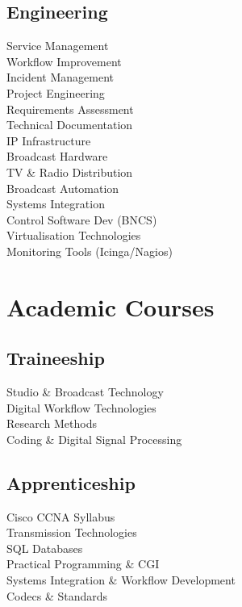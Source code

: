 \documentclass[]{deedy-resume-openfont}
\begin{document}
\begin{minipage}[t]{0.33\textwidth}
\subsection{Engineering}
Service Management \\
Workflow Improvement \\
Incident Management \\
Project Engineering \\
Requirements Assessment \\ 
Technical Documentation \\
IP Infrastructure \\
Broadcast Hardware \\
TV \& Radio Distribution \\
Broadcast Automation \\
Systems Integration \\
Control Software Dev (BNCS) \\
Virtualisation Technologies \\
Monitoring Tools (Icinga/Nagios)\\


\section{Academic Courses}
\subsection{Traineeship}
Studio \& Broadcast Technology \\
Digital Workflow Technologies \\
Research Methods \\
Coding \& Digital Signal Processing \\
\sectionsep

\subsection{Apprenticeship}
Cisco CCNA Syllabus \\
Transmission Technologies \\
SQL Databases \\
Practical Programming \& CGI\\
Systems Integration \& Workflow Development \\
Codecs \& Standards \\
\sectionsep

%
%

\end{minipage} 
\end{document}
